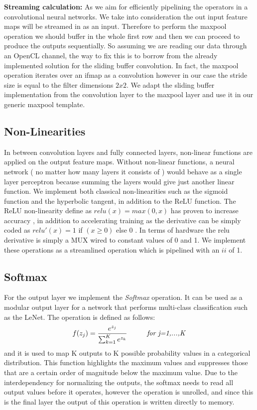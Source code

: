 \textbf{Streaming calculation:} As we aim for efficiently pipelining the operators in a convolutional neural networks. We take into consideration the out input feature maps will be streamed in as an input. Therefore to perform the maxpool operation we should buffer in the whole first row and then we can proceed to produce the outputs sequentially. So assuming we are reading our data through an OpenCL channel, the way to fix this is to borrow from the already implemented solution for the sliding buffer convolution. In fact, the maxpool operation iterates over an ifmap as a convolution however in our case the stride size is equal to the filter dimensions $ 2x2 $. We adapt the sliding buffer implementation from the convolution layer to the maxpool layer and use it in our generic maxpool template. 

\subsection{Non-Linearities} 

In between convolution layers and fully connected layers, non-linear functions are applied on the output feature maps. Without non-linear functions, a neural network ( no matter how many layers it consists of ) would behave as a single layer perceptron because summing the layers would give just another linear function. We implement both classical non-linearities such as the sigmoid function and the hyperbolic tangent, in addition to the ReLU function. The ReLU non-linearity  define as $ relu(x)  = max(0, x) $ has proven to increase accuracy \cite{alexnet}, in addition to accelerating training as the derivative can be simply coded as $ relu'(x) = 1 $ if $ (x \geq 0 ) $ else $ 0 $ .  In terms of hardware the relu derivative is simply a MUX wired to constant values of 0 and 1. We implement these operations as a streamlined operation which is pipelined with an $ ii $ of 1.

\subsection{Softmax}

For the output layer we implement the \emph{Softmax} operation. It can be used as a modular output layer for a network that performs multi-class classification such as the LeNet. The operation is defined as follows: 
\begin{equation}
	f(z_j) = \frac{e^{z_j}}{\sum_{k=1}^{K} e^{z_k} } \hspace{1cm}  \mbox{\emph{for j=1,...,K}}
\end{equation}
and it is used to map K outputs to K possible probability values in a categorical distribution. This function highlights the maximum values and suppresses those that are a certain order of magnitude below the maximum value.  Due to the interdependency for normalizing the outputs, the softmax needs to read all output values before it operates, however the operation is unrolled, and since this is the final layer the output of this operation is written directly to memory.

